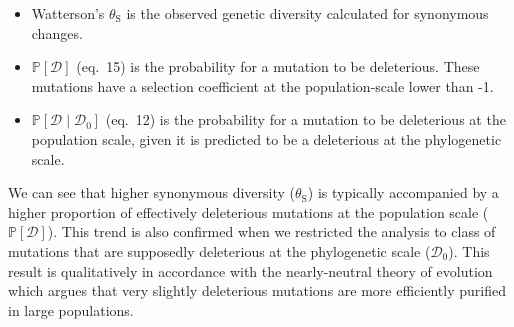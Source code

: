 \documentclass{article}
\newcommand{\proba}{\mathbb{P}}
\newcommand{\SphyDel}{\mathcal{D}_0}
\newcommand{\given}{\mid}
\newcommand{\SpopDel}{\mathcal{D}}
\newcommand{\thetaSyn}{\theta_{\text{S}}}
\begin{document}
    \begin{itemize}
        \item Watterson's $\thetaSyn$ is the observed genetic diversity calculated for synonymous changes.
        \item $\proba [ \SpopDel ]$ (eq.~15) is the probability for a mutation to be deleterious.
        These mutations have a selection coefficient at the population-scale lower than -1.
        \item $\proba [ \SpopDel \given \SphyDel ]$ (eq.~12) is the probability for a mutation to be deleterious at the population scale, given it is predicted to be a deleterious at the phylogenetic scale.
    \end{itemize}

    We can see that higher synonymous diversity ($\thetaSyn$) is typically accompanied by a higher proportion of effectively deleterious mutations at the population scale ($\proba [ \SpopDel ]$).
    This trend is also confirmed when we restricted the analysis to class of mutations that are supposedly deleterious at the phylogenetic scale ($\SphyDel$).
    This result is qualitatively in accordance with the nearly-neutral theory of evolution which argues that very slightly deleterious mutations are more efficiently purified in large populations.
\end{document}
